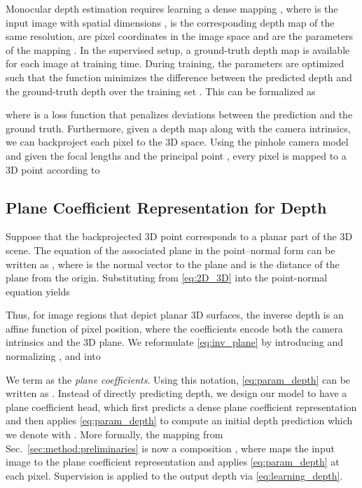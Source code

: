 \documentclass[final]{cvpr}
\begin{document}
Monocular depth estimation requires learning a dense mapping , where  is the input image with spatial dimensions ,  is the corresponding depth map of the same resolution,  are pixel coordinates in the image space and  are the parameters of the mapping . In the supervised setup, a ground-truth depth map  is available for each image  at training time. During training, the parameters  are optimized such that the function  minimizes the difference between the predicted depth and the ground-truth depth over the training set . This can be formalized as

where  is a loss function that penalizes deviations between the prediction and the ground truth. Furthermore, given a depth map  along with the camera intrinsics, we can backproject each pixel to the 3D space. Using the pinhole camera model and given the focal lengths  and the principal point , every pixel  is mapped to a 3D point  according to


\subsection{Plane Coefficient Representation for Depth}
\label{sec:method:plane:coefficients}

Suppose that the backprojected 3D point  corresponds to a planar part of the 3D scene. The equation of the associated plane in the point–normal form can be written as , where  is the normal vector to the plane and  is the distance of the plane from the origin. Substituting  from \eqref{eq:2D_3D} into the point-normal equation yields
\vspace{-0.2cm}

Thus, for image regions that depict planar 3D surfaces, the inverse depth is an affine function of pixel position, where the coefficients encode both the camera intrinsics and the 3D plane. We reformulate \eqref{eq:inv_plane} by introducing  and normalizing ,  and  into
\vspace{-0.4cm}

We term  as the \emph{plane coefficients}. Using this notation, \eqref{eq:param_depth} can be written as . Instead of directly predicting depth, we design our model to have a plane coefficient head, which first predicts a dense plane coefficient representation  and then applies \eqref{eq:param_depth} to compute an initial depth prediction which we denote with . More formally, the mapping  from Sec.~\ref{sec:method:preliminaries} is now a composition , where  maps the input image to the plane coefficient representation and  applies \eqref{eq:param_depth} at each pixel. 
Supervision is applied to the output depth  via \eqref{eq:learning_depth}.
\end{document}
